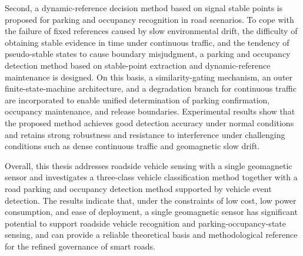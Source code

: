 Second, a dynamic-reference decision method based on signal stable points is proposed for parking and occupancy recognition in road scenarios. To cope with the failure of fixed references caused by slow environmental drift, the difficulty of obtaining stable evidence in time under continuous traffic, and the tendency of pseudo-stable states to cause boundary misjudgment, a parking and occupancy detection method based on stable-point extraction and dynamic-reference maintenance is designed. On this basis, a similarity-gating mechanism, an outer finite-state-machine architecture, and a degradation branch for continuous traffic are incorporated to enable unified determination of parking confirmation, occupancy maintenance, and release boundaries. Experimental results show that the proposed method achieves good detection accuracy under normal conditions and retains strong robustness and resistance to interference under challenging conditions such as dense continuous traffic and geomagnetic slow drift.

Overall, this thesis addresses roadside vehicle sensing with a single geomagnetic sensor and investigates a three-class vehicle classification method together with a road parking and occupancy detection method supported by vehicle event detection. The results indicate that, under the constraints of low cost, low power consumption, and ease of deployment, a single geomagnetic sensor has significant potential to support roadside vehicle recognition and parking-occupancy-state sensing, and can provide a reliable theoretical basis and methodological reference for the refined governance of smart roads.
